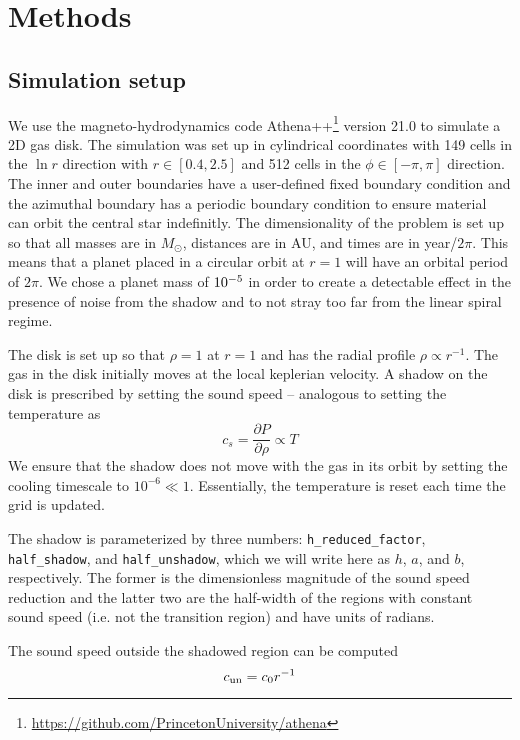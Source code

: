 \documentclass[twocolumn]{aastex631}
\begin{document}
\section{Methods}
\label{sec:methods}
\subsection{Simulation setup}
\label{subsec:setup}
We use the magneto-hydrodynamics code Athena++\footnote{\url{https://github.com/PrincetonUniversity/athena}} 
\citep{stone2020} version 21.0 \citep{athena++developmentteam2021} to simulate a 2D gas disk. The simulation was set up in cylindrical coordinates with 149
cells in the $\ln{r}$ direction with $r \in [0.4, 2.5]$ and 512 cells in the $\phi \in [-\pi, \pi]$ direction. The inner and outer boundaries have a user-defined fixed boundary
condition and the azimuthal boundary has a periodic boundary condition to ensure material can orbit the central star indefinitly. The dimensionality of the problem
is set up so that all masses are in $M_\odot$, distances are in AU, and times are in year/$2\pi$. This means that a planet placed in a circular orbit at $r=1$
will have an orbital period of $2\pi$. We chose a planet mass of $10^{-5}$ in order to create a detectable effect in the presence of noise from the shadow and
to not stray too far from the linear spiral regime.

The disk is set up so that $\rho = 1$ at $r=1$ and has the radial profile $\rho \propto r^{-1}$. The gas in the disk initially moves at the local keplerian velocity.
A shadow on the disk is prescribed by setting the sound speed -- analogous to setting the temperature as 
\begin{equation}
    c_s = \frac{\partial P}{\partial \rho} \propto T
\end{equation}
We ensure that the shadow does not move with the gas in its orbit by setting the cooling timescale to $10^{-6} \ll 1$. Essentially, the temperature is reset each time
the grid is updated.

The shadow is parameterized by three numbers: \texttt{h\_reduced\_factor}, \texttt{half\_shadow}, and \texttt{half\_unshadow},
which we will write here as $h$, $a$, and $b$, respectively. The former is the dimensionless magnitude of the sound speed reduction
and the latter two are the half-width of the regions with constant sound speed (i.e. not the transition region) and have
units of radians.

The sound speed outside the shadowed region can be computed
\begin{equation}
    c_{\rm un} = c_0 r^{-1}
\end{equation}
\end{document}
